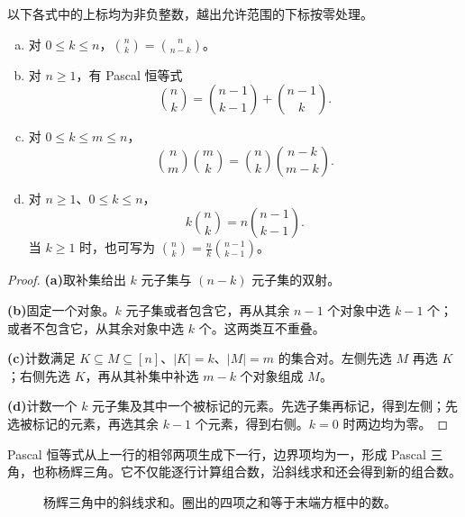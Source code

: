 \documentclass[lang=cn,a4paper,fontset=none,zihao=false,10pt,openany,twoside]{beautybook}
\numberwithin{algorithm}{chapter}
\begin{document}
\begin{proposition}[组合数的基本恒等式]\label{prop:binomial-identities}
以下各式中的上标均为非负整数，越出允许范围的下标按零处理。
\begin{enumerate}[(a)]
\item 对 $0\le k\le n$，$\binom nk=\binom n{n-k}$。
\item 对 $n\ge1$，有 Pascal 恒等式
\[
 \binom nk=\binom{n-1}{k-1}+\binom{n-1}k.
\]
\item 对 $0\le k\le m\le n$，
\[
 \binom nm\binom mk=\binom nk\binom{n-k}{m-k}.
\]
\item 对 $n\ge1$、$0\le k\le n$，
\[
 k\binom nk=n\binom{n-1}{k-1}.
\]
当 $k\ge1$ 时，也可写为 $\binom nk=\frac nk\binom{n-1}{k-1}$。
\end{enumerate}
\end{proposition}
\begin{proof}
\par\smallskip\noindent\textbf{(a)}\quad 取补集给出 $k$ 元子集与 $(n-k)$ 元子集的双射。

\par\smallskip\noindent\textbf{(b)}\quad 固定一个对象。$k$ 元子集或者包含它，再从其余 $n-1$ 个对象中选 $k-1$ 个；或者不包含它，从其余对象中选 $k$ 个。这两类互不重叠。

\par\smallskip\noindent\textbf{(c)}\quad 计数满足 $K\subseteq M\subseteq[n]$、$|K|=k$、$|M|=m$ 的集合对。左侧先选 $M$ 再选 $K$；右侧先选 $K$，再从其补集中补选 $m-k$ 个对象组成 $M$。

\par\smallskip\noindent\textbf{(d)}\quad 计数一个 $k$ 元子集及其中一个被标记的元素。先选子集再标记，得到左侧；先选被标记的元素，再选其余 $k-1$ 个元素，得到右侧。$k=0$ 时两边均为零。
\end{proof}
Pascal 恒等式从上一行的相邻两项生成下一行，边界项均为一，形成 Pascal 三角，也称杨辉三角。它不仅能逐行计算组合数，沿斜线求和还会得到新的组合数。
\begin{figure}[H]
\centering
{}
\caption{杨辉三角中的斜线求和。圈出的四项之和等于末端方框中的数。}
\end{figure}
\end{document}
